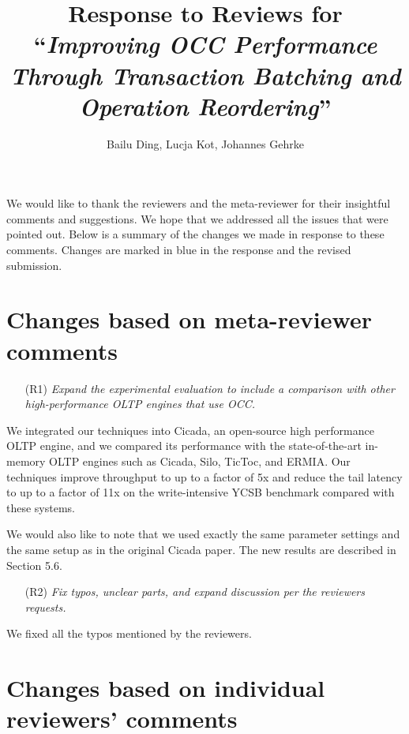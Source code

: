 \documentclass{article}
\newcommand{\changed}[1]{#1}
\newcommand{\changed}[1]{{\color{blue}#1}}
\begin{document}
\title{Response to Reviews for ``\emph{Improving OCC Performance Through Transaction Batching and Operation Reordering}''}
\author{Bailu Ding, Lucja Kot, Johannes Gehrke}
\date{}
\maketitle

We would like to thank the reviewers and the meta-reviewer for their insightful comments and suggestions. We hope that we addressed all the issues that were pointed out. Below is a summary of the changes we made in response to these comments. Changes are marked in blue in the response and the revised submission.

\section{Changes based on meta-reviewer comments}


\begin{itemize}
	\item[(R1)] \emph{Expand the experimental evaluation to include a comparison with other high-performance OLTP engines that use OCC.}
\end{itemize}

\changed{
We integrated our techniques into Cicada, an open-source high performance OLTP engine, and we compared its performance with the state-of-the-art in-memory OLTP engines such as Cicada, Silo, TicToc, and ERMIA. Our techniques improve throughput to up to a factor of 5x and reduce the tail latency to up to a factor of 11x on the write-intensive YCSB benchmark compared with these systems.

We would also like to note that we used exactly the same parameter settings and the same setup as in the original Cicada paper. The new results are described in Section 5.6.
}

\begin{itemize}
	\item[(R2)] \emph{Fix typos, unclear parts, and expand discussion per the reviewers requests.}
\end{itemize}

\changed{
	We fixed all the typos mentioned by the reviewers.
}

\section{Changes based on individual reviewers' comments}
\end{document}

